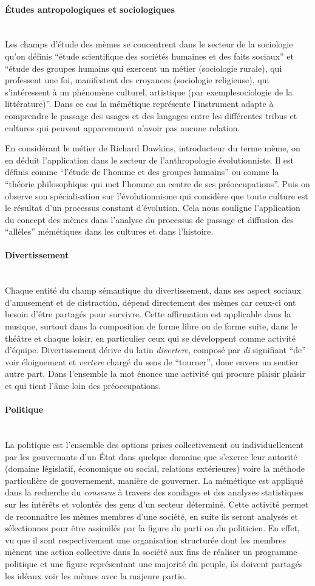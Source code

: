 \documentclass[12pt]{article}
\newcommand{\myparagraph}[1]{\paragraph{#1}\mbox{}\\}
\begin{document}
\myparagraph{\'{E}tudes antropologiques et sociologiques}
Les champs d'étude des mèmes se concentrent dans le secteur de la
sociologie qu'on définis ``étude scientifique des sociétés humaines et
des faits sociaux'' et ``étude des groupes humains qui exercent un
métier (sociologie rurale), qui professent une foi, manifestent des
croyances (sociologie religieuse), qui s'intéressent à un phénomène
culturel, artistique (par exemplesociologie de la littérature)''. Dans
ce cas la mémétique représente l'instrument adapte à comprendre le
passage des usages et des langages entre les différentes tribus et
cultures qui peuvent apparemment n'avoir pas aucune relation.

En considérant le métier de Richard Dawkins, introducteur du terme mème,
on en déduit l'application dans le secteur de l'anthropologie
évolutionniste. Il est définis comme ``l'étude de l'homme et des groupes
humains'' ou comme la ``théorie philosophique qui met l'homme au centre
de ses préoccupations''. \cite{gene} Puis on observe son spécialisation sur
l'évolutionnisme qui considère que toute culture est le résultat d'un
processus constant d'évolution. Cela nous souligne l'application du
concept des mèmes dans l'analyse du processus de passage et diffusion
des ``allèles'' mémétiques dans les cultures et dans l'histoire.


\myparagraph{Divertissement}
Chaque entité du champ sémantique du divertissement, dans ses aspect
sociaux d'amusement et de distraction, dépend directement des mèmes car
ceux-ci ont besoin d'être partagés pour survivre. Cette affirmation est
applicable dans la musique, surtout dans la composition de forme libre
ou de forme suite, dans le théâtre et chaque loisir, en particulier ceux
qui se développent comme activité d'équipe. Divertissement dérive du
latin \emph{divertere}, composé par \emph{di} signifiant ``de'' voir
éloignement et \emph{vertere} chargé du sens de ``tourner'', donc envers
un sentier autre part. \cite{IL} Dans l'ensemble la mot énonce une activité qui
procure plaisir plaisir et qui tient l'âme loin des préoccupations.


\myparagraph{Politique}
La politique est l'ensemble des options prises collectivement ou
individuellement par les gouvernants d'un État dans quelque domaine que
s'exerce leur autorité (domaine législatif, économique ou social,
relations extérieures) voire la méthode particulière de gouvernement,
manière de gouverner. La mémétique est appliqué dans la recherche du
\emph{consesus} à travers des sondages et des analyses statistiques sur
les intérêts et volontés des gens d'un secteur déterminé. Cette activité
permet de reconnaitre les mèmes membres d'une société, en suite ils
seront analysés et sélectionnes pour être assimilés par la figure du
parti ou du politicien. En effet, vu que il sont respectivement une
organisation structurée dont les membres mènent une action collective
dans la société aux fins de réaliser un programme politique et une
figure représentant une majorité du peuple, ils doivent partagés les
idéaux voir les mèmes avec la majeure partie.
\end{document}
